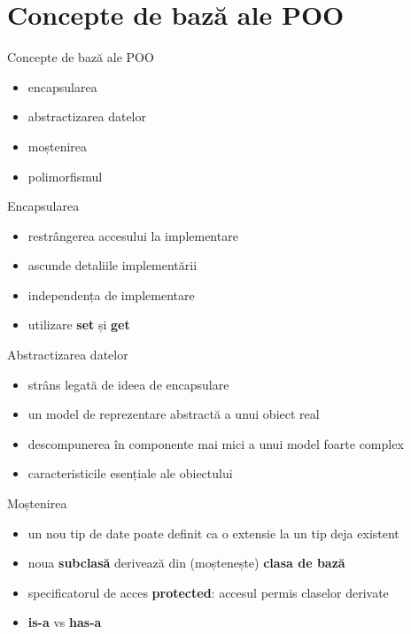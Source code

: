 \documentclass{beamer}
\begin{document}
\section{Concepte de bază ale POO}

\begin{frame}{Concepte de bază ale POO}
  \begin{itemize}
  \item encapsularea
  \item abstractizarea datelor
  \item moștenirea
  \item polimorfismul
  \end{itemize}
\end{frame}

\begin{frame}{Encapsularea}    
 \begin{itemize}
  \item restrângerea accesului la implementare
  \item ascunde detaliile implementării
  \item independența de implementare
  \item utilizare \textbf{set} și \textbf{get}
  \end{itemize}  
\end{frame}

\begin{frame}{Abstractizarea datelor}   
  \begin{itemize}
  \item strâns legată de ideea de encapsulare
  \item un model de reprezentare abstractă a unui obiect real
  \item descompunerea în componente mai mici a unui model foarte complex
  \item caracteristicile esențiale ale obiectului
  \end{itemize}  
\end{frame}

\begin{frame}{Moștenirea}
  \begin{itemize}
  \item un nou tip de date poate definit ca o extensie la un tip deja existent
  \item noua \textbf{subclasă} derivează din (moștenește) \textbf{clasa de bază}
  \item specificatorul de acces \textbf{protected}: accesul permis claselor derivate
  \item \textbf{is-a} vs \textbf{has-a}
  \end{itemize}    
\end{frame}
\end{document}
